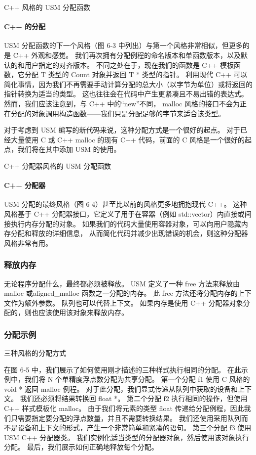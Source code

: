 {\color{red} C++ 风格的 USM 分配函数}

\paragraph{C++ 的分配}

USM 分配函数的下一个风格（图 6-3 中列出）与第一个风格非常相似，但更多的是 C++ 外观和感觉。 
我们再次拥有分配例程的命名版本和单函数版本，以及默认的和用户指定的对齐版本。 
不同之处在于，现在我们的函数是 C++ 模板函数，它分配 T 类型的 Count 对象并返回 T * 类型的指针。 
利用现代 C++ 可以简化事情，因为我们不再需要手动计算分配的总大小（以字节为单位）或将返回的指针转换为适当的类型。 
这也往往会在代码中产生更紧凑且不易出错的表达式。 
然而，我们应该注意到，与 C++ 中的“new”不同，
malloc 风格的接口不会为正在分配的对象调用构造函数——我们只是分配足够的字节来适合该类型。

对于考虑到 USM 编写的新代码来说，这种分配方式是一个很好的起点。 
对于已经大量使用 C 或 C++ malloc 的现有 C++ 代码，前面的 C 风格是一个很好的起点，我们将在其中添加 USM 的使用。

{\color{red} C++ 分配器风格的 USM 分配函数}

\paragraph{C++ 分配器}

USM 分配的最终风格（图 6-4）甚至比以前的风格更多地拥抱现代 C++。 
这种风格基于 C++ 分配器接口，它定义了用于在容器（例如 std::vector）内直接或间接执行内存分配的对象。 
如果我们的代码大量使用容器对象，可以向用户隐藏内存分配和释放的详细信息，
从而简化代码并减少出现错误的机会，则这种分配器风格非常有用。

\subsubsection{释放内存}
无论程序分配什么，最终都必须被释放。 
USM 定义了一种 free 方法来释放由 malloc 或aligned\_malloc 函数之一分配的内存。 
此 free 方法还将分配内存的上下文作为额外参数。 队列也可以代替上下文。 
如果内存是使用 C++ 分配器对象分配的，则也应该使用该对象来释放内存。

\subsubsection{分配示例}
{\color{red} 三种风格的分配方式}

在图 6-5 中，我们展示了如何使用刚才描述的三种样式执行相同的分配。 
在此示例中，我们将 N 个单精度浮点数分配为共享分配。 第一个分配 f1 使用 C 风格的 void * 返回 malloc 例程。 
对于此分配，我们显式传递从队列中获取的设备和上下文。 我们还必须将结果转换回 float *。 
第二个分配 f2 执行相同的操作，但使用 C++ 样式模板化 malloc。 
由于我们将元素的类型 float 传递给分配例程，因此我们只需要指定要分配的浮点数量，并且不需要转换结果。 
我们还使用采用队列而不是设备和上下文的形式，产生一个非常简单和紧凑的语句。 
第三个分配 f3 使用 USM C++ 分配器类。 我们实例化适当类型的分配器对象，然后使用该对象执行分配。 
最后，我们展示如何正确地释放每个分配。

